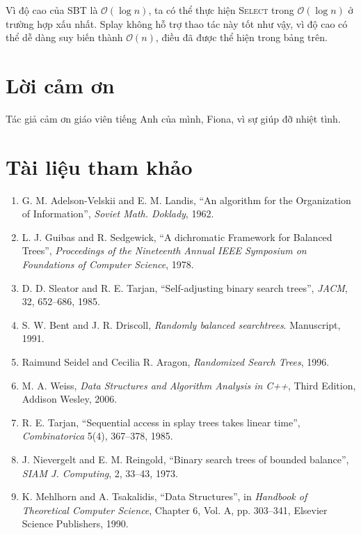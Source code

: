 \documentclass[11pt]{article}
\newcommand{\Oh}{\mathcal{O}}
\begin{document}
Vì độ cao của SBT là $\Oh(\log n)$, ta có thể thực hiện \textsc{Select} trong
$\Oh(\log n)$ ở trường hợp xấu nhất. Splay không hỗ trợ thao tác này tốt như
vậy, vì độ cao có thể dễ dàng suy biến thành $\Oh(n)$, điều đã được thể hiện
trong bảng trên.

\section*{Lời cảm ơn}

Tác giả cảm ơn giáo viên tiếng Anh của mình, Fiona, vì sự giúp đỡ nhiệt tình.

\section*{Tài liệu tham khảo}

\begin{enumerate}
  \item G. M. Adelson-Velskii and E. M. Landis, ``An algorithm for the
  Organization of Information'', \textit{Soviet Math. Doklady}, 1962.
  \item L. J. Guibas and R. Sedgewick, ``A dichromatic Framework for Balanced
  Trees'', \textit{Proceedings of the Nineteenth Annual IEEE Symposium on
  Foundations of Computer Science}, 1978.
  \item D. D. Sleator and R. E. Tarjan, ``Self-adjusting binary search
  trees'', \textit{JACM}, 32, 652--686, 1985.
  \item S. W. Bent and J. R. Driscoll, \textit{Randomly balanced searchtrees}.
  Manuscript, 1991.
  \item Raimund Seidel and Cecilia R. Aragon, \textit{Randomized Search
  Trees}, 1996.
  \item M. A. Weiss, \textit{Data Structures and Algorithm Analysis in C++},
  Third Edition, Addison Wesley, 2006.
  \item R. E. Tarjan, ``Sequential access in splay trees takes linear time'',
  \textit{Combinatorica} 5(4), 367--378, 1985.
  \item J. Nievergelt and E. M. Reingold, ``Binary search trees of bounded
  balance'', \textit{SIAM J. Computing}, 2, 33--43, 1973.
  \item K. Mehlhorn and A. Tsakalidis, ``Data Structures'', in
  \textit{Handbook of Theoretical Computer Science}, Chapter 6, Vol. A,
  pp. 303--341, Elsevier Science Publishers, 1990.
\end{enumerate}
\end{document}
